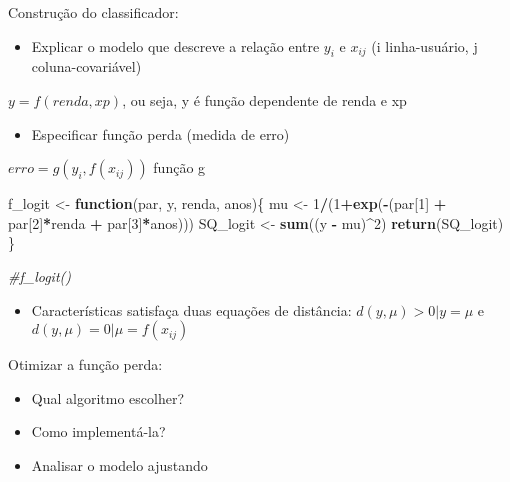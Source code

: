\documentclass[
]{article}
\newenvironment{Shaded}{\begin{snugshade}}{\end{snugshade}}
\newcommand{\CommentTok}[1]{\textcolor[rgb]{0.56,0.35,0.01}{\textit{#1}}}
\newcommand{\ControlFlowTok}[1]{\textcolor[rgb]{0.13,0.29,0.53}{\textbf{#1}}}
\newcommand{\DecValTok}[1]{\textcolor[rgb]{0.00,0.00,0.81}{#1}}
\newcommand{\FunctionTok}[1]{\textcolor[rgb]{0.13,0.29,0.53}{\textbf{#1}}}
\newcommand{\NormalTok}[1]{#1}
\newcommand{\OtherTok}[1]{\textcolor[rgb]{0.56,0.35,0.01}{#1}}
\newcommand{\SpecialCharTok}[1]{\textcolor[rgb]{0.81,0.36,0.00}{\textbf{#1}}}
\providecommand{\tightlist}{%
  \setlength{\itemsep}{0pt}\setlength{\parskip}{0pt}}
\begin{document}
Construção do classificador:

\begin{itemize}
\tightlist
\item
  Explicar o modelo que descreve a relação entre \(y_{i}\) e \(x_{ij}\)
  (i linha-usuário, j coluna-covariável)
\end{itemize}

\(y=f(renda,xp)\), ou seja, y é função dependente de renda e xp

\begin{itemize}
\tightlist
\item
  Especificar função perda (medida de erro)
\end{itemize}

\(erro=g( y_{i},f(x_{ij}))\) função g

\begin{Shaded}
\begin{Highlighting}[]
\NormalTok{f\_logit }\OtherTok{\textless{}{-}} \ControlFlowTok{function}\NormalTok{(par, y, renda, anos)\{}
\NormalTok{  mu }\OtherTok{\textless{}{-}} \DecValTok{1}\SpecialCharTok{/}\NormalTok{(}\DecValTok{1}\SpecialCharTok{+}\FunctionTok{exp}\NormalTok{(}\SpecialCharTok{{-}}\NormalTok{(par[}\DecValTok{1}\NormalTok{] }\SpecialCharTok{+}\NormalTok{ par[}\DecValTok{2}\NormalTok{]}\SpecialCharTok{*}\NormalTok{renda }\SpecialCharTok{+}\NormalTok{ par[}\DecValTok{3}\NormalTok{]}\SpecialCharTok{*}\NormalTok{anos)))}
\NormalTok{  SQ\_logit }\OtherTok{\textless{}{-}} \FunctionTok{sum}\NormalTok{((y }\SpecialCharTok{{-}}\NormalTok{ mu)}\SpecialCharTok{\^{}}\DecValTok{2}\NormalTok{)}
  \FunctionTok{return}\NormalTok{(SQ\_logit)}
\NormalTok{\}}


\CommentTok{\#f\_logit()}
\end{Highlighting}
\end{Shaded}

\begin{itemize}
\tightlist
\item
  Características satisfaça duas equações de distância:
  \(d(y,\mu)>0 | y= \mu\) e \(d(y,\mu)=0 | \mu=f(x_{ij})\)
\end{itemize}

Otimizar a função perda:

\begin{itemize}
\tightlist
\item
  Qual algoritmo escolher?
\item
  Como implementá-la?
\item
  Analisar o modelo ajustando
\end{itemize}
\end{document}

